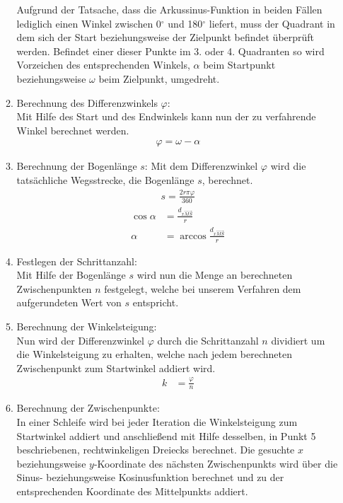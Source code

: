 \begin{itemize}
\begin{enumerate}
Aufgrund der Tatsache, dass die Arkussinus-Funktion in beiden Fällen lediglich einen Winkel zwischen 0$^\circ$ und 180$^\circ$ liefert, muss der Quadrant in dem sich der Start beziehungsweise der Zielpunkt befindet überprüft werden. Befindet einer dieser Punkte  im 3. oder 4. Quadranten so wird Vorzeichen des entsprechenden Winkels, $\alpha$ beim Startpunkt beziehungsweise $\omega$ beim Zielpunkt, umgedreht. 
\item Berechnung des Differenzwinkels $\varphi$:\\
Mit Hilfe des Start und des Endwinkels kann nun der zu verfahrende Winkel berechnet werden.
\begin{align*}
\varphi = \omega - \alpha
\end{align*}
\item Berechnung der Bogenlänge $s$:
Mit dem Differenzwinkel $\varphi$ wird die tatsächliche Wegsstrecke, die Bogenlänge $s$, berechnet.
\begin{align*}
s = \frac{2r \pi \varphi}{360}
\end{align*}
\begin{align*}
\cos \alpha & = \frac{d_{x\overrightarrow{MS}}}{r}\\
\alpha & = \arccos \frac{d_{x\overrightarrow{MS}}}{r}
\end{align*}
\item Festlegen der Schrittanzahl:\\
Mit Hilfe der Bogenlänge $s$ wird nun die Menge an berechneten Zwischenpunkten $n$ festgelegt, welche bei unserem Verfahren dem aufgerundeten Wert von  $s$ entspricht.
\item Berechnung der Winkelsteigung:\\
Nun wird der Differenzwinkel $\varphi$ durch die Schrittanzahl $n$ dividiert um die Winkelsteigung zu erhalten, welche nach jedem berechneten Zwischenpunkt zum Startwinkel addiert wird.
\begin{align*}
k & = \frac{\varphi}{n}
\end{align*}
\item Berechnung der Zwischenpunkte:\\
In einer Schleife wird bei jeder Iteration die Winkelsteigung zum Startwinkel addiert und anschließend mit Hilfe desselben, in Punkt 5 beschriebenen, rechtwinkeligen Dreiecks berechnet. Die gesuchte $x$ beziehungsweise $y$-Koordinate des nächsten Zwischenpunkts wird über die Sinus- beziehungsweise Kosinusfunktion berechnet und zu der entsprechenden Koordinate des Mittelpunkts addiert.
\begin{align*}

\end{align*}
\end{enumerate}
\end{itemize}
